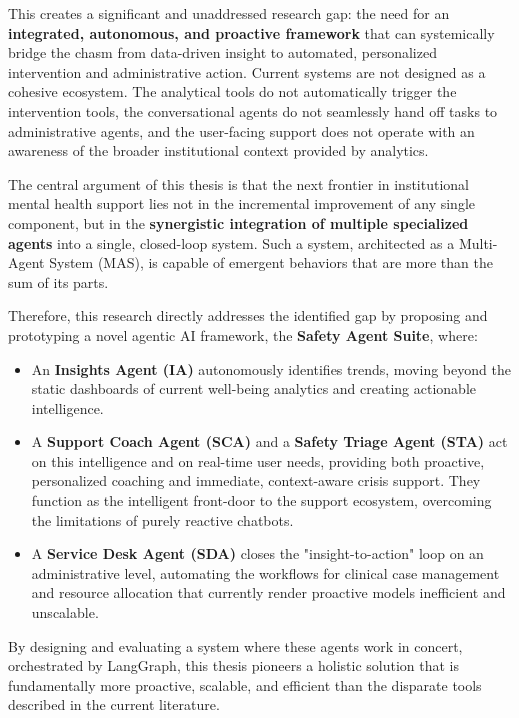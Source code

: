 This creates a significant and unaddressed research gap: the need for an \textbf{integrated, autonomous, and proactive framework} that can systemically bridge the chasm from data-driven insight to automated, personalized intervention and administrative action. Current systems are not designed as a cohesive ecosystem. The analytical tools do not automatically trigger the intervention tools, the conversational agents do not seamlessly hand off tasks to administrative agents, and the user-facing support does not operate with an awareness of the broader institutional context provided by analytics.

The central argument of this thesis is that the next frontier in institutional mental health support lies not in the incremental improvement of any single component, but in the \textbf{synergistic integration of multiple specialized agents} into a single, closed-loop system. Such a system, architected as a Multi-Agent System (MAS), is capable of emergent behaviors that are more than the sum of its parts.

Therefore, this research directly addresses the identified gap by proposing and prototyping a novel agentic AI framework, the \textbf{Safety Agent Suite}, where:
\begin{itemize}
    \item An \textbf{Insights Agent (IA)} autonomously identifies trends, moving beyond the static dashboards of current well-being analytics and creating actionable intelligence.
    \item A \textbf{Support Coach Agent (SCA)} and a \textbf{Safety Triage Agent (STA)} act on this intelligence and on real-time user needs, providing both proactive, personalized coaching and immediate, context-aware crisis support. They function as the intelligent front-door to the support ecosystem, overcoming the limitations of purely reactive chatbots.
    \item A \textbf{Service Desk Agent (SDA)} closes the "insight-to-action" loop on an administrative level, automating the workflows for clinical case management and resource allocation that currently render proactive models inefficient and unscalable.
\end{itemize}

By designing and evaluating a system where these agents work in concert, orchestrated by LangGraph, this thesis pioneers a holistic solution that is fundamentally more proactive, scalable, and efficient than the disparate tools described in the current literature.
